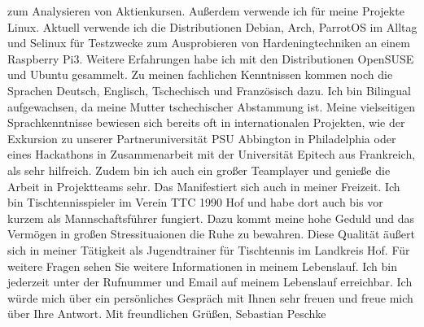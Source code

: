 zum Analysieren von Aktienkursen. \newline\newline
Außerdem verwende ich für meine Projekte Linux. Aktuell verwende ich die Distributionen Debian, Arch, ParrotOS im Alltag und Selinux für Testzwecke zum Ausprobieren von Hardeningtechniken
an einem Raspberry Pi3. Weitere Erfahrungen habe ich mit den Distributionen OpenSUSE und Ubuntu gesammelt. \newline\newline
Zu meinen fachlichen Kenntnissen kommen noch die Sprachen Deutsch, Englisch, Tschechisch und Französisch dazu. Ich bin Bilingual aufgewachsen, da meine Mutter tschechischer Abstammung ist.
Meine vielseitigen Sprachkenntnisse bewiesen sich bereits oft in internationalen Projekten, wie der Exkursion zu unserer Partneruniversität PSU Abbington in Philadelphia oder
eines Hackathons in Zusammenarbeit mit der Universität Epitech aus Frankreich, als sehr hilfreich. \newline\newline
Zudem bin ich auch ein großer Teamplayer und genieße die Arbeit in Projektteams sehr. Das Manifestiert sich auch in meiner Freizeit. Ich bin Tischtennisspieler im Verein TTC 1990 Hof
und habe dort auch bis vor kurzem als Mannschaftsführer fungiert. Dazu kommt meine hohe Geduld und das Vermögen in großen Stressituaionen die Ruhe zu bewahren. Diese Qualität äußert sich
in meiner Tätigkeit als Jugendtrainer für Tischtennis im Landkreis Hof. \newline\newline
Für weitere Fragen sehen Sie weitere Informationen in meinem Lebenslauf. Ich bin jederzeit unter der Rufnummer und Email auf meinem Lebenslauf erreichbar. Ich würde mich über ein
persönliches Gespräch mit Ihnen sehr freuen und freue mich über Ihre Antwort. \newline\newline
\noindent
Mit freundlichen Grüßen,\newline
Sebastian Peschke